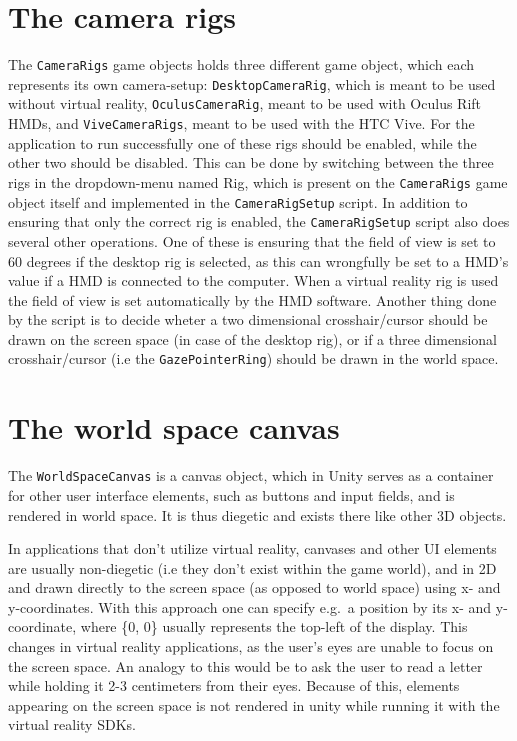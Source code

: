 \section{The camera rigs}
The \texttt{CameraRigs} game objects holds three different game object, which each represents its own camera-setup: \texttt{DesktopCameraRig}, which is meant to be used
without virtual reality, \texttt{OculusCameraRig}, meant to be used with Oculus Rift HMDs, and \texttt{ViveCameraRigs}, meant to be used with the HTC Vive.
For the application to run successfully one of these rigs should be enabled, while the other two should be disabled.
This can be done by switching between the three rigs in the dropdown-menu named Rig, which is present on the \texttt{CameraRigs} game object itself and
implemented in the \texttt{CameraRigSetup} script. In addition to ensuring that only the correct rig is enabled, 
the \texttt{CameraRigSetup} script also does several other operations. One of these is ensuring that the field of view is set to 60 degrees if the desktop rig 
is selected, as this can wrongfully be set to a HMD's value if a HMD is connected to the computer. When a virtual reality rig is used the field of view is 
set automatically by the HMD software. Another thing done by the script is to decide wheter a two dimensional crosshair/cursor should be drawn on the screen space
(in case of the desktop rig), or if a three dimensional crosshair/cursor (i.e the \texttt{GazePointerRing}) should be drawn in the world space. 

\section{The world space canvas}
The \texttt{WorldSpaceCanvas} is a canvas object, which in Unity serves as a container for other user interface elements, such as buttons and input fields, 
and is rendered in world space. It is thus diegetic and exists there like other 3D objects.

In applications that don't utilize virtual reality, canvases and other UI elements are usually non-diegetic (i.e they don't exist within the game world), 
and in 2D and drawn directly to the screen space (as opposed to world space) using x- and y-coordinates.
With this approach one can specify e.g.~a position by its x- and y-coordinate, where \{0, 0\} usually represents the top-left of the display.
This changes in virtual reality applications, as the user's eyes are unable to focus on the screen space. An analogy to this would be to 
ask the user to read a letter while holding it 2-3 centimeters from their eyes. Because of this, elements appearing on the screen space is not rendered
in unity while running it with the virtual reality SDKs. 

